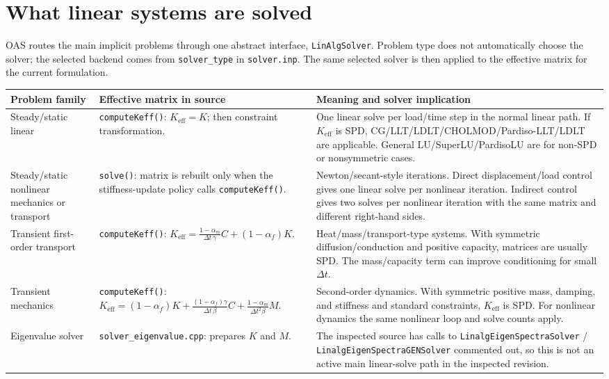 \documentclass[10pt,a4paper]{article}
\newcommand{\code}[1]{\texttt{#1}}
\begin{document}
\section{What linear systems are solved}

OAS routes the main implicit problems through one abstract interface, \code{LinAlgSolver}. Problem type does not automatically choose the solver; the selected backend comes from \code{solver\_type} in \code{solver.inp}. The same selected solver is then applied to the effective matrix for the current formulation.

\begin{table}[h]
\small
\centering
\begin{tabularx}{\textwidth}{L{0.20\textwidth} L{0.32\textwidth} Y}
\toprule
Problem family & Effective matrix in source & Meaning and solver implication \\
\midrule
Steady/static linear & \code{computeKeff()}: \(K_{\mathrm{eff}}=K\); then constraint transformation. & One linear solve per load/time step in the normal linear path. If \(K_{\mathrm{eff}}\) is SPD, CG/LLT/LDLT/CHOLMOD/Pardiso-LLT/LDLT are applicable. General LU/SuperLU/PardisoLU are for non-SPD or nonsymmetric cases. \\
\addlinespace
Steady/static nonlinear mechanics or transport & \code{solve()}: matrix is rebuilt only when the stiffness-update policy calls \code{computeKeff()}. & Newton/secant-style iterations. Direct displacement/load control gives one linear solve per nonlinear iteration. Indirect control gives two solves per nonlinear iteration with the same matrix and different right-hand sides. \\
\addlinespace
Transient first-order transport & \code{computeKeff()}: \(K_{\mathrm{eff}}=\frac{1-\alpha_m}{\Delta t\,\gamma}C+(1-\alpha_f)K\). & Heat/mass/transport-type systems. With symmetric diffusion/conduction and positive capacity, matrices are usually SPD. The mass/capacity term can improve conditioning for small \(\Delta t\). \\
\addlinespace
Transient mechanics & \code{computeKeff()}: \(K_{\mathrm{eff}}=(1-\alpha_f)K + \frac{(1-\alpha_f)\gamma}{\Delta t\,\beta}C + \frac{1-\alpha_m}{\Delta t^2\beta}M\). & Second-order dynamics. With symmetric positive mass, damping, and stiffness and standard constraints, \(K_{\mathrm{eff}}\) is SPD. For nonlinear dynamics the same nonlinear loop and solve counts apply. \\
\addlinespace
Eigenvalue solver & \code{solver\_eigenvalue.cpp}: prepares \(K\) and \(M\). & The inspected source has calls to \code{LinalgEigenSpectraSolver} / \code{LinalgEigenSpectraGENSolver} commented out, so this is not an active main linear-solve path in the inspected revision. \\
\bottomrule
\end{tabularx}
\end{table}
\end{document}
